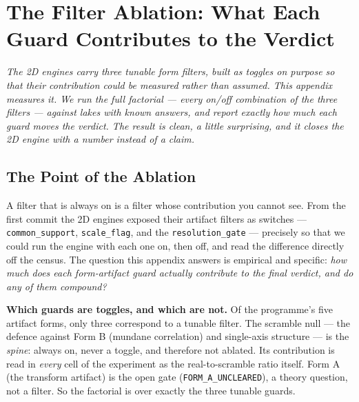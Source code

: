 \documentclass[11pt, letterpaper, openany]{book}
\begin{document}

\appendix

\chapter{The Filter Ablation: What Each Guard Contributes to the Verdict}

\begin{center}
\textit{The 2D engines carry three tunable form filters, built as toggles on purpose so that their
contribution could be measured rather than assumed. This appendix measures it. We run the full
factorial --- every on/off combination of the three filters --- against lakes with known answers, and
report exactly how much each guard moves the verdict. The result is clean, a little surprising, and it
closes the 2D engine with a number instead of a claim.}
\end{center}

\section{The Point of the Ablation}

A filter that is always on is a filter whose contribution you cannot see. From the first commit the
2D engines exposed their artifact filters as switches --- \texttt{common\_support}, \texttt{scale\_flag},
and the \texttt{resolution\_gate} --- precisely so that we could run the engine with each one on, then
off, and read the difference directly off the census. The question this appendix answers is empirical
and specific: \emph{how much does each form-artifact guard actually contribute to the final verdict,
and do any of them compound?}

\begin{warningbox}
\textbf{Which guards are toggles, and which are not.} Of the programme's five artifact forms, only three
correspond to a tunable filter. The scramble null --- the defence against Form B (mundane correlation)
and single-axis structure --- is the \emph{spine}: always on, never a toggle, and therefore not ablated.
Its contribution is read in \emph{every} cell of the experiment as the real-to-scramble ratio itself.
Form A (the transform artifact) is the open gate (\texttt{FORM\_A\_UNCLEARED}), a theory question, not a
filter. So the factorial is over exactly the three tunable guards.
\end{warningbox}
\end{document}
